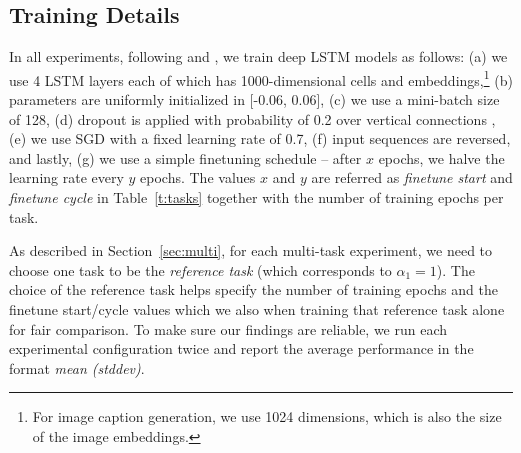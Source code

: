 \subsection{Training Details}

In all experiments, following \citet{sutskever14} and \citet{luong15}, we train deep LSTM
models as follows: (a) we use 4 LSTM layers each of which has
1000-dimensional cells and embeddings,\footnote{For image caption generation, we use 1024
dimensions, which is also the size of the image embeddings.} (b) parameters are
uniformly initialized in [-0.06, 0.06], (c) we use a mini-batch size of 128, (d)
dropout is applied with probability of 0.2 over vertical connections
\citep{pham2014dropout}, (e) we use SGD with a fixed
learning rate of 0.7, (f) input sequences are reversed, and lastly, (g) we use a simple finetuning schedule -- after $x$
epochs, we halve the learning rate every $y$ epochs. The values $x$ and $y$
are referred as {\it finetune start} and {\it finetune cycle} in
Table~\ref{t:tasks} together with the number of training epochs per task.

As described in Section~\ref{sec:multi}, for each multi-task
experiment, we need to choose one task to be the {\it reference
task} (which corresponds to $\alpha_1 = 1$). The choice of the
reference task helps specify the number of training epochs and the
finetune start/cycle values which we also when training that reference
task alone for fair comparison. To make sure our findings are
reliable, we run each experimental configuration twice and
report the average performance in the format {\it mean (stddev)}.

